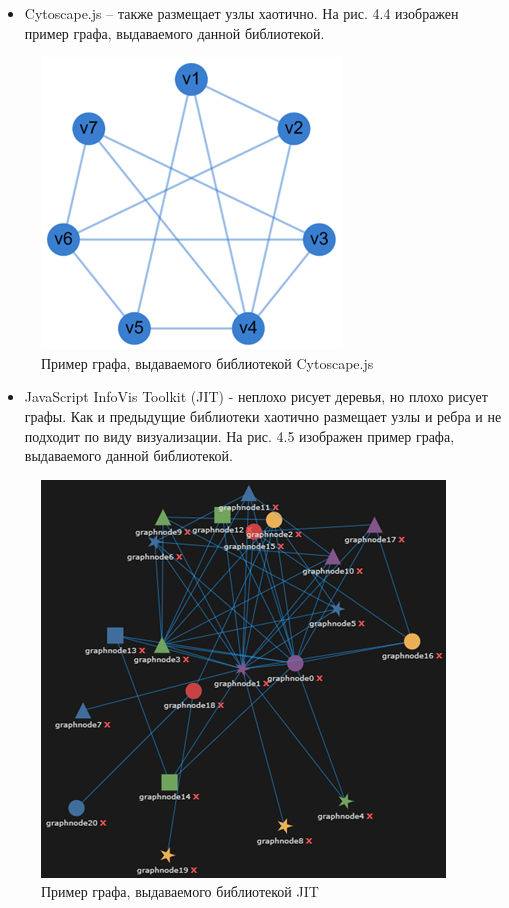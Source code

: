 \begin{itemize}
\item Cytoscape.js – также размещает узлы хаотично. На рис. 4.4 изображен пример графа, выдаваемого данной библиотекой.
\end{itemize}
\begin{figure}[h]
	\center
	\includegraphics [scale=0.9] {my_folder/images/my/15}
	\caption{Пример графа, выдаваемого библиотекой Cytoscape.js}
	\label{fig:15}
\end{figure}
\begin{itemize}
\item JavaScript InfoVis Toolkit (JIT) - неплохо рисует деревья, но плохо рисует графы. Как и предыдущие библиотеки хаотично размещает узлы и ребра и не подходит по виду визуализации.  На рис. 4.5 изображен пример графа, выдаваемого данной библиотекой.
\end{itemize}
\begin{figure}[h]
	\center
	\includegraphics [scale=0.9] {my_folder/images/my/16}
	\caption{Пример графа, выдаваемого библиотекой JIT}
	\label{fig:16}
\end{figure}
